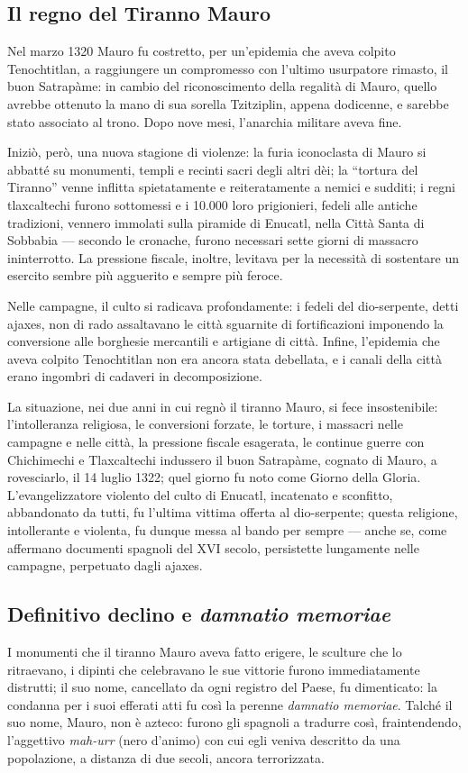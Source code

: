 \documentclass[italian,a4paper]{article}
\begin{document}
 \subsection*{Il regno del Tiranno Mauro}
 Nel marzo 1320 Mauro fu costretto, per un'epidemia che aveva colpito
 Tenochtitlan, a raggiungere un compromesso con l'ultimo usurpatore rimasto,
 il buon Satrapàme: in cambio del riconoscimento della regalità di Mauro,
 quello avrebbe ottenuto la mano di sua sorella Tzitziplin, appena
 dodicenne, e sarebbe stato associato al trono. Dopo nove mesi, l'anarchia
 militare aveva fine.

 Iniziò, però, una nuova stagione di violenze: la furia iconoclasta di Mauro
 si abbatté su monumenti, templi e recinti sacri degli altri dèi; la
 ``tortura del Tiranno'' venne inflitta spietatamente e reiteratamente a
 nemici e sudditi; i regni tlaxcaltechi furono sottomessi e i 10.000 loro
 prigionieri, fedeli alle antiche tradizioni, vennero immolati sulla
 piramide di Enucatl, nella Città Santa di Sobbabia --- secondo le cronache,
 furono necessari sette giorni di massacro ininterrotto. La pressione fiscale,
 inoltre, levitava per la necessità di sostentare un esercito sembre più
 agguerito e sempre più feroce.

 Nelle campagne, il culto si radicava profondamente: i fedeli del
 dio-serpente, detti ajaxes, non di rado assaltavano le città sguarnite di
 fortificazioni imponendo la conversione alle borghesie mercantili e
 artigiane di città. Infine, l'epidemia che aveva colpito Tenochtitlan non
 era ancora stata debellata, e i canali della città erano ingombri di
 cadaveri in decomposizione.

 La situazione, nei due anni in cui regnò il tiranno Mauro, si fece
 insostenibile: l'intolleranza religiosa, le conversioni forzate, le
 torture, i massacri nelle campagne e nelle città, la pressione fiscale
 esagerata, le continue guerre con Chichimechi e Tlaxcaltechi indussero il
 buon Satrapàme, cognato di Mauro, a rovesciarlo, il 14 luglio 1322; quel
 giorno fu noto come Giorno della Gloria. L'evangelizzatore violento del
 culto di Enucatl, incatenato e sconfitto, abbandonato da tutti, fu l'ultima
 vittima offerta al dio-serpente; questa religione, intollerante e violenta,
 fu dunque messa al bando per sempre --- anche se, come affermano documenti
 spagnoli del XVI secolo, persistette lungamente nelle campagne, perpetuato
 dagli ajaxes.
 \subsection*{Definitivo declino e \emph{damnatio memoriae}}
 I monumenti che il tiranno Mauro aveva fatto erigere, le sculture che lo
 ritraevano, i dipinti che celebravano le sue vittorie furono immediatamente
 distrutti; il suo nome, cancellato da ogni registro del Paese, fu
 dimenticato: la condanna per i suoi efferati atti fu così la perenne
 \emph{damnatio memoriae}. Talché il suo nome, Mauro, non è azteco: furono gli
 spagnoli a tradurre così, fraintendendo, l'aggettivo \emph{mah-urr} (nero
 d'animo) con cui egli veniva descritto da una popolazione, a distanza di due
 secoli, ancora terrorizzata.
\end{document}
